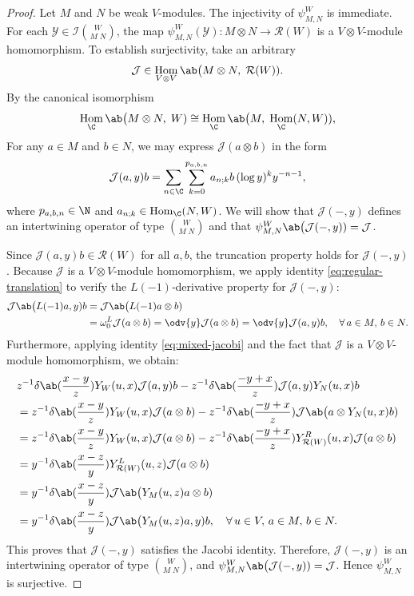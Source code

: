 \documentclass[12pt, english]{article}
\numberwithin{equation}{section}
\DeclareMathOperator{\Hom}{Hom}
\theoremstyle{plain}
\theoremstyle{definition}
\theoremstyle{remark}
\begin{document}
	\begin{proof}
		
		Let $M$ and $N$ be weak $V$-modules. The injectivity of $\psi^W_{M, N}$ is immediate.
		For each $\mathcal{Y} \in \mathcal{I}\binom{W}{M\;N}$, the map
		$\psi^W_{M, N}(\mathcal{Y}) \colon M\otimes N \to \mathcal{R}(W)$ is a
		$V\otimes V$-module homomorphism. To establish surjectivity, take an arbitrary
		\[
		\mathcal{J} \in \Hom_{V \otimes V} \ab\big(M \otimes N, \; \mathcal{R}(W)).
		\]
		By the canonical isomorphism
		\[
		\Hom_{\C} \ab\big(M \otimes N, \; W) \cong \Hom_{\C} \ab\big(M, \; \Hom_{\C}(N, W)),
		\]
		For any $a \in M$ and $b \in N$,  we may express $\mathcal{J}(a\otimes b) $ in the form
		\[
		\mathcal{J}(a, y) b = \sum_{n \in \C} \sum_{k = 0}^{p_{a, b, n}} a_{n;k}b\, (\log y)^k y^{-n-1},
		\]
		where $p_{a, b, n} \in \N$ and $a_{n;k} \in \Hom_{\C}(N, W)$.
		We will show that $\mathcal{J}(-, y)$ defines an intertwining operator of type $\binom{W}{M\;N}$ and that $\psi^W_{M, N} \ab\big(\mathcal{J}(-, y)) = \mathcal{J}$.
		
		Since $\mathcal{J}(a, y) b \in \mathcal{R}(W)$ for all $a, b$, the truncation property holds for $\mathcal{J}(-, y)$.
		Because $\mathcal{J}$ is a $V\otimes V$-module homomorphism, we apply identity \eqref{eq:regular-translation} to verify the $L(-1)$‑derivative property for $\mathcal{J}(-, y)$:
		\begin{align*}
			\mathcal{J} \ab\big(L(-1) a, y) b
			& = \mathcal{J} \ab\big(L(-1) a \otimes b) \\
			& = \omega^L_0 \mathcal{J}(a\otimes b)
			= \odv{y}\mathcal{J}(a\otimes b)
			= \odv{y}\mathcal{J}(a, y) b,
			\quad \forall\, a \in M, \, b \in N.
		\end{align*}
		Furthermore, applying identity \eqref{eq:mixed-jacobi} and the fact that $\mathcal{J}$ is a $V\otimes V$-module homomorphism, we obtain:
		\begin{align*}
			& z^{-1} \delta \ab(\frac{x-y}{z}) Y_{W}(u, x) \mathcal{J}(a, y) b
			- z^{-1} \delta \ab(\frac{-y+x}{z}) \mathcal{J}(a, y) Y_{N}(u, x) b \\
			& = z^{-1} \delta \ab(\frac{x-y}{z}) Y_{W}(u, x) \mathcal{J}(a\otimes b)
			- z^{-1} \delta \ab(\frac{-y+x}{z}) \mathcal{J} \ab\big(a\otimes Y_{N}(u, x) b) \\
			& = z^{-1} \delta \ab(\frac{x-y}{z}) Y_{W}(u, x) \mathcal{J}(a\otimes b)
			- z^{-1} \delta \ab(\frac{-y+x}{z}) Y^{R}_{\mathcal{R}(W)}(u, x) \mathcal{J}(a\otimes b) \\
			& = y^{-1} \delta \ab(\frac{x-z}{y}) Y^L_{\mathcal{R}(W)}(u, z) \mathcal{J}(a\otimes b) \\
			& = y^{-1} \delta \ab(\frac{x-z}{y}) \mathcal{J} \ab\big(Y_{M}(u, z) a \otimes b) \\
			& = y^{-1} \delta \ab(\frac{x-z}{y}) \mathcal{J} \ab\big(Y_{M}(u, z) a, y) b,
			\quad \forall\, u \in V, \, a \in M, \, b \in N.
		\end{align*}
		This proves that $\mathcal{J}(-, y)$ satisfies the Jacobi identity.
		Therefore, $\mathcal{J}(-, y)$ is an intertwining operator of type $\binom{W}{M \; N}$, and $\psi^W_{M, N} \ab\big(\mathcal{J}(-, y)) = \mathcal{J}$.
		Hence $\psi^W_{M, N}$ is surjective.
		

\end{proof}
\end{document}
